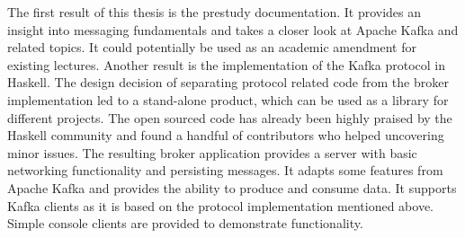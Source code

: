 The first result of this thesis is the prestudy documentation. It provides an
insight into messaging fundamentals and takes a closer look at Apache Kafka
and related topics. It could potentially be used as an academic amendment for
existing lectures. Another result is the implementation of the Kafka protocol
in Haskell. The design decision of separating protocol related code from the
broker implementation led to a stand-alone product, which can be used as a
library for different projects. The open sourced code has already been highly
praised by the Haskell community and found a handful of contributors who
helped uncovering minor issues. The resulting broker application provides a
server with basic networking functionality and persisting messages. It adapts
some features from Apache Kafka and provides the ability to produce and
consume data. It supports Kafka clients as it is based on the protocol
implementation mentioned above. Simple console clients are provided to
demonstrate functionality.
